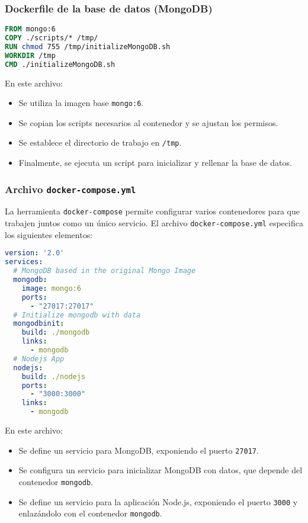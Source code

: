 \subsubsection{Dockerfile de la base de datos (MongoDB)}

\begin{lstlisting}[language=Dockerfile]
FROM mongo:6
COPY ./scripts/* /tmp/
RUN chmod 755 /tmp/initializeMongoDB.sh
WORKDIR /tmp
CMD ./initializeMongoDB.sh
\end{lstlisting}

En este archivo:
\begin{itemize}
    \item Se utiliza la imagen base \texttt{mongo:6}.
    \item Se copian los scripts necesarios al contenedor y se ajustan los permisos.
    \item Se establece el directorio de trabajo en \texttt{/tmp}.
    \item Finalmente, se ejecuta un script para inicializar y rellenar la base de datos.
\end{itemize}

\subsubsection{Archivo \texttt{docker-compose.yml}}

La herramienta \texttt{docker-compose} permite configurar varios contenedores para que trabajen juntos como un único servicio. El archivo \texttt{docker-compose.yml} especifica los siguientes elementos:



\begin{lstlisting}[language=yaml]
version: '2.0'
services:
  # MongoDB based in the original Mongo Image
  mongodb:
    image: mongo:6
    ports:
      - "27017:27017"
  # Initialize mongodb with data
  mongodbinit:
    build: ./mongodb
    links:
      - mongodb
  # Nodejs App
  nodejs:
    build: ./nodejs
    ports:
      - "3000:3000"
    links:
      - mongodb
\end{lstlisting}

En este archivo:
\begin{itemize}
    \item Se define un servicio para MongoDB, exponiendo el puerto \texttt{27017}.
    \item Se configura un servicio para inicializar MongoDB con datos, que depende del contenedor \texttt{mongodb}.
    \item Se define un servicio para la aplicación Node.js, exponiendo el puerto \texttt{3000} y enlazándolo con el contenedor \texttt{mongodb}.
\end{itemize}

